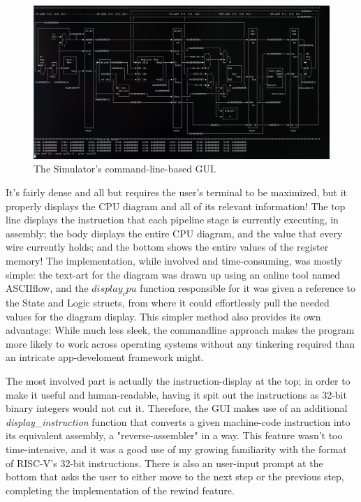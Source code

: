 \documentclass[12pt,twoside]{reedthesis}
\begin{document}
\begin{figure}[h!]

	\centering
	\includegraphics[scale=0.35]{simulator_screenshot}
	\caption{The Simulator's command-line-based GUI.}
	\label{simulator}
\end{figure}

\break

It's fairly dense and all but requires the user's terminal to be maximized, but it properly displays the CPU diagram and all of its relevant information! The top line displays the instruction that each pipeline stage is currently executing, in assembly; the body displays the entire CPU diagram, and the value that every wire currently holds; and the bottom shows the entire values of the register memory! The implementation, while involved and time-consuming, was mostly simple: the text-art for the diagram was drawn up using an online tool named ASCIIflow, and the $display_cpu$ function responsible for it was given a reference to the State and Logic structs, from where it could effortlessly pull the needed values for the diagram display. This simpler method also provides its own advantage: While much less sleek, the commandline approach makes the program more likely to work across operating systems without any tinkering required than an intricate app-develoment framework might.

The most involved part is actually the instruction-display at the top; in order to make it useful and human-readable, having it spit out the instructions as 32-bit binary integers would not cut it. Therefore, the GUI makes use of an additional \textit{display\_instruction} function that converts a given machine-code instruction into its equivalent assembly, a "reverse-assembler" in a way. This feature wasn't too time-intensive, and it was a good use of my growing familiarity with the format of RISC-V's 32-bit instructions.
There is also an user-input prompt at the bottom that asks the user to either move to the next step or the previous step, completing the implementation of the rewind feature.
\end{document}
